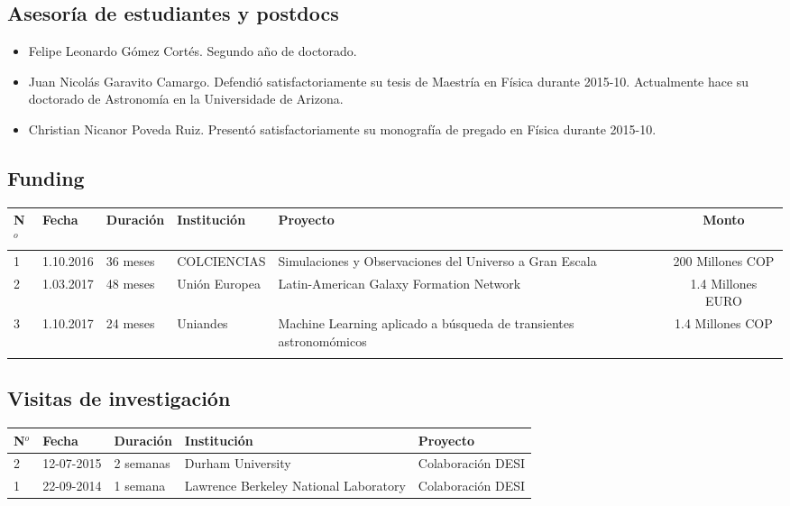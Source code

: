 \documentclass{article}
\begin{document}
\subsection{Asesor\'ia de estudiantes y postdocs}

\begin{itemize}
\item{Felipe Leonardo G\'omez Cort\'es. Segundo a\~no de doctorado.}
\item{Juan Nicol\'as Garavito Camargo. Defendi\'o satisfactoriamente
  su tesis de Maestr\'ia en F\'isica durante 2015-10. Actualmente hace su doctorado de
  Astronom\'ia en la Universidade de Arizona.}
\item{Christian Nicanor Poveda Ruiz. Present\'o satisfactoriamente su
  monograf\'ia de pregado en F\'isica durante 2015-10.}
\end{itemize}

\subsection{Funding}
\begin{tabular}{l l l p{2.4cm} p{4.0cm} c}\hline
N$^{o}$ & Fecha & Duraci\'on & Instituci\'on & Proyecto & Monto \\\hline
1 & 1.10.2016 & 36 meses & COLCIENCIAS & Simulaciones y Observaciones del Universo a Gran Escala & 200 Millones COP\\\hline
2 & 1.03.2017 & 48 meses & Uni\'on Europea & Latin-American Galaxy Formation Network & 1.4 Millones EURO \\\hline
3 & 1.10.2017 & 24 meses & Uniandes & Machine Learning aplicado a b\'usqueda de transientes astronom\'omicos& 1.4 Millones COP \\
\\\hline 
\end{tabular}

\subsection{Visitas de investigaci\'on}

\begin{tabular}{l l l p{3.5cm} p{5.0cm}}\hline
N$^{o}$ & Fecha & Duraci\'on & Instituci\'on & Proyecto \\\hline
2 & 12-07-2015 & 2 semanas & Durham University & Colaboraci\'on DESI\\
1 & 22-09-2014 & 1 semana & Lawrence Berkeley National
Laboratory & Colaboraci\'on DESI\\\hline
\end{tabular}
\end{document}
